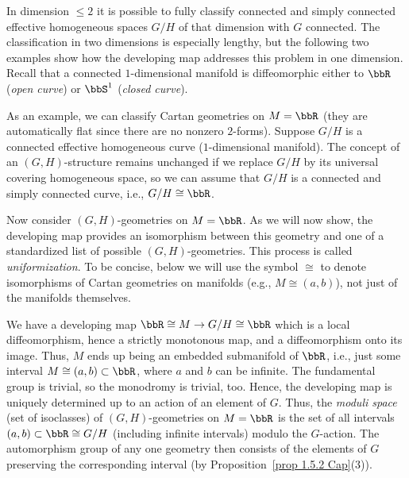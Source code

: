In dimension $\leq 2$ it is possible to fully classify connected and simply connected effective homogeneous spaces $G\slash H$ of that dimension with $G$ connected. The classification in two dimensions is especially lengthy, but the following two examples show how the developing map addresses this problem in one dimension. Recall that a connected $1$-dimensional manifold is diffeomorphic either to $\bbR$ (\emph{open curve}) or $\bbS^1$ (\emph{closed curve}).

\begin{example}
    As an example, we can classify Cartan geometries on $M=\bbR$ (they are automatically flat since there are no nonzero $2$-forms).  Suppose $G\slash H$ is a connected effective homogeneous curve ($1$-dimensional manifold). The concept of an $(G,H)$-structure remains unchanged if we replace $G\slash H$ by its universal covering homogeneous space, so we can assume that $G\slash H$ is a connected and simply connected curve, i.e., $G\slash H\cong \bbR$.

    Now consider $(G,H)$-geometries on $M=\bbR$. As we will now show, the developing map provides an isomorphism between this geometry and one of a standardized list of possible $(G,H)$-geometries. This process is called \emph{uniformization}. To be concise, below we will use the symbol $\cong$ to denote isomorphisms of Cartan geometries on manifolds (e.g., $M\cong (a,b)$), not just of the manifolds themselves.
    
    We have a developing map $\bbR\cong M\to G\slash H\cong \bbR$ which is a local diffeomorphism, hence a strictly monotonous map, and a diffeomorphism onto its image. Thus, $M$ ends up being an embedded submanifold of $\bbR$, i.e., just some interval $M\cong (a,b)\subset\bbR$, where $a$ and $b$ can be infinite. The fundamental group is trivial, so the monodromy is trivial, too. Hence, the developing map is uniquely determined up to an action of an element of $G$. Thus, the \emph{moduli space} (set of isoclasses) of $(G,H)$-geometries on $M=\bbR$ is the set of all intervals $(a,b)\subset\bbR\cong  G\slash H$ (including infinite intervals) modulo the $G$-action. The automorphism group of any one geometry then consists of the elements of $G$ preserving the corresponding interval (by Proposition~\ref{prop 1.5.2 Cap}(3)). 


\end{example}
